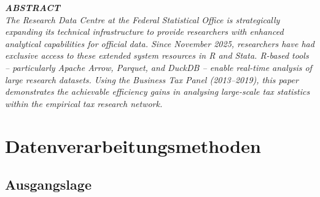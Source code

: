 \documentclass[
  german,
  10pt,
  twoside]{article}
\renewcommand*\contentsname{Inhaltsverzeichnis}
\newcommand\contentsname{Inhaltsverzeichnis}
\begin{document}
\begin{titlepage}
\begin{minipage}[t]{11.8cm}
\vspace{0.3cm}

{\itshape\color{wistaDarkGray}\bfseries\MakeUppercase{Abstract}}\\[0.15cm]
\small\itshape
The Research Data Centre at the Federal Statistical Office is strategically expanding its technical infrastructure to provide researchers with enhanced analytical capabilities for official data. Since November 2025, researchers have had exclusive access to these extended system resources in R and Stata. R-based tools -- particularly Apache Arrow, Parquet, and DuckDB -- enable real-time analysis of large research datasets. Using the Business Tax Panel (2013--2019), this paper demonstrates the achievable efficiency gains in analysing large-scale tax statistics within the empirical tax research network.

\end{minipage}

\vfill

\vspace{0.5cm}
\noindent{}

\end{titlepage}

\pagestyle{fancy}

\renewcommand*\contentsname{Inhaltsverzeichnis}
{
\hypersetup{linkcolor=}
\setcounter{tocdepth}{3}
\tableofcontents
}

\section{Datenverarbeitungsmethoden}\label{sec-methoden}

\subsection{Ausgangslage}\label{ausgangslage}
\end{document}
